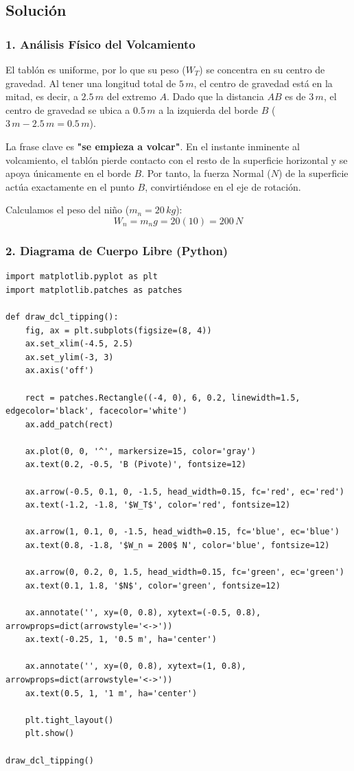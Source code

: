 \documentclass[12pt, a4paper]{article}
\begin{document}
\subsection*{Solución}

\subsubsection*{1. Análisis Físico del Volcamiento}
El tablón es uniforme, por lo que su peso ($W_T$) se concentra en su centro de gravedad. Al tener una longitud total de $5 \, \si{m}$, el centro de gravedad está en la mitad, es decir, a $2.5 \, \si{m}$ del extremo $A$.
Dado que la distancia $AB$ es de $3 \, \si{m}$, el centro de gravedad se ubica a $0.5 \, \si{m}$ a la izquierda del borde $B$ ($3 \, \si{m} - 2.5 \, \si{m} = 0.5 \, \si{m}$).

La frase clave es \textbf{"se empieza a volcar"}. En el instante inminente al volcamiento, el tablón pierde contacto con el resto de la superficie horizontal y se apoya únicamente en el borde $B$. Por tanto, la fuerza Normal ($N$) de la superficie actúa exactamente en el punto $B$, convirtiéndose en el eje de rotación.

Calculamos el peso del niño ($m_n = 20 \, \si{kg}$):
$$W_n = m_n g = 20(10) = 200 \, \si{N}$$

\subsubsection*{2. Diagrama de Cuerpo Libre (Python)}

\begin{lstlisting}
import matplotlib.pyplot as plt
import matplotlib.patches as patches

def draw_dcl_tipping():
    fig, ax = plt.subplots(figsize=(8, 4))
    ax.set_xlim(-4.5, 2.5)
    ax.set_ylim(-3, 3)
    ax.axis('off')

    rect = patches.Rectangle((-4, 0), 6, 0.2, linewidth=1.5, edgecolor='black', facecolor='white')
    ax.add_patch(rect)

    ax.plot(0, 0, '^', markersize=15, color='gray')
    ax.text(0.2, -0.5, 'B (Pivote)', fontsize=12)

    ax.arrow(-0.5, 0.1, 0, -1.5, head_width=0.15, fc='red', ec='red')
    ax.text(-1.2, -1.8, '$W_T$', color='red', fontsize=12)
    
    ax.arrow(1, 0.1, 0, -1.5, head_width=0.15, fc='blue', ec='blue')
    ax.text(0.8, -1.8, '$W_n = 200$ N', color='blue', fontsize=12)

    ax.arrow(0, 0.2, 0, 1.5, head_width=0.15, fc='green', ec='green')
    ax.text(0.1, 1.8, '$N$', color='green', fontsize=12)

    ax.annotate('', xy=(0, 0.8), xytext=(-0.5, 0.8), arrowprops=dict(arrowstyle='<->'))
    ax.text(-0.25, 1, '0.5 m', ha='center')

    ax.annotate('', xy=(0, 0.8), xytext=(1, 0.8), arrowprops=dict(arrowstyle='<->'))
    ax.text(0.5, 1, '1 m', ha='center')

    plt.tight_layout()
    plt.show()

draw_dcl_tipping()
\end{lstlisting}
\end{document}
